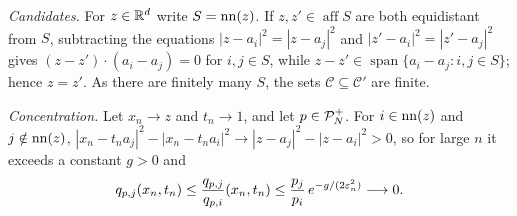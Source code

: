 \documentclass{article}
\theoremstyle{plain}
\theoremstyle{remark}
\begin{document}
\emph{Candidates.} For $z\in\mathbb{R}^d$ write $S=\operatorname{nn}(z)$. If $z,z'\in\operatorname{aff}S$ are both
equidistant from $S$, subtracting the equations $|z-a_i|^2=|z-a_j|^2$ and
$|z'-a_i|^2=|z'-a_j|^2$ gives $(z-z')\cdot(a_i-a_j)=0$ for $i,j\in S$, while
$z-z'\in\operatorname{span}\{a_i-a_j:i,j\in S\}$; hence $z=z'$. As there are finitely many
$S$, the sets $\mathcal C\subseteq\mathcal C'$ are finite.

\emph{Concentration.} Let $x_n\to z$ and $t_n\to1$, and let $p\in\mathcal{P}_N^{+}$. For $i\in\operatorname{nn}(z)$
and $j\notin\operatorname{nn}(z)$, $|x_n-t_na_j|^2-|x_n-t_na_i|^2\to|z-a_j|^2-|z-a_i|^2>0$, so for large $n$
it exceeds a constant $g>0$ and
\begin{equation}
q_{p,j}(x_n,t_n)\le\frac{q_{p,j}}{q_{p,i}}(x_n,t_n)
\le\frac{p_j}{p_i}\,e^{-g/(2\varepsilon_n^2)}\longrightarrow0 .
\label{eq:pf:int:conc}
\end{equation}
\end{document}
